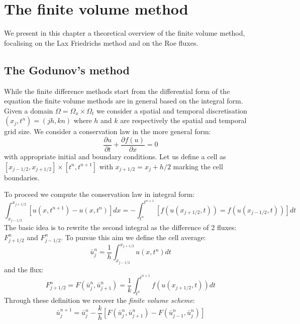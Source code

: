 \documentclass[oneside,12pt]{book}  %
\theoremstyle{plain}
\theoremstyle{definition}
\theoremstyle{remark}
\numberwithin{equation}{chapter} %
\begin{document}
 


\chapter{The finite volume method}
We present in this chapter a theoretical overview of the finite volume
method, focalising on the Lax Friedrichs method and on the Roe
fluxes. 
\section{The Godunov's method}
While the finite difference methods start from the differential form
of the equation the finite volume methods are in general based on the
integral form.
Given a domain $\Omega=\Omega_x\times \Omega_t$ we consider a spatial
and temporal discretisation $(x_j,t^n)=(jh,kn)$ where $h$ and $k$ are
respectively the spatial and temporal grid size.
We consider a conservation law in the more general form:
\begin{equation}
  \label{eq:conservation_law}
  \frac{\partial u}{\partial t}+\frac{\partial f(u)}{\partial x}=0
\end{equation}
with appropriate initial and boundary conditions.
Let us define a cell as $[x_{j-1/2},x_{j+1/2}]\times [t^n,t^{n+1}]$
with $x_{j+1/2}=x_j+h/2$ marking the cell boundaries. 

To proceed we compute the conservation law in integral form:
\begin{equation}
  \label{eq:conservation_law_integral_form}
  \int_{x_{j-1/2}}^{x_{j+1/2}}[u(x,t^{n+1})-u(x,t^n)]dx=-\int_{t^n}^{t^{n+1}}[f(u(x_{j+1/2},t))=f(u(x_{j-1/2},t))]dt
\end{equation}
The basic idea is to rewrite the second integral as the difference of
2 fluxes: $F^{n}_{j+1/2}$ and $F^{n}_{j-1/2}$. 
To pursue this aim we define the cell average:
\begin{equation}
  \label{eq:cell_average}
  \bar{u}^{n}_{j}=\frac{1}{h}\int_{x_{j-1/2}}^{x_{j+1/2}}u(x,t^{n})dt
\end{equation}
and the flux:
\begin{equation}
  \label{eq:generic_flux}
  F^{n}_{j+1/2}=F(\bar{u}^{n}_{j},\bar{u}^{n}_{j+1})=\frac{1}{k}\int_{t^n}^{t^{n+1}}f(u(x_{j+1/2},t))dt
\end{equation}
Through these definition we recover the \textit{finite volume scheme}:
\begin{equation}
  \label{eq:generic_finite_volume}
  \bar{u}^{n+1}_{j}=\bar{u}^{n}_{j}-\frac{k}{h}[F(\bar{u}^{n}_{j},\bar{u}^{n}_{j+1})-F(\bar{u}^{n}_{j-1},\bar{u}^{n}_{j})]
\end{equation}
\end{document}
